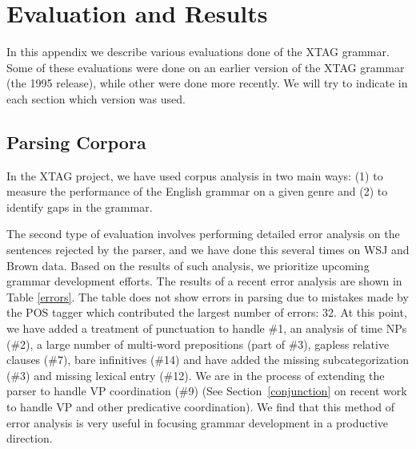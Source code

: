 \chapter{Evaluation and Results}
\label{evaluation}

In this appendix we describe various evaluations done of the XTAG
grammar. Some of these evaluations were done on an earlier version of
the XTAG grammar (the 1995 release), while other were done more
recently. We will try to indicate in each section which version was
used. 

\section{Parsing Corpora}

In the XTAG project, we have used corpus analysis in two main ways:
(1) to measure the performance of the English grammar on a given genre
and (2) to identify gaps in the grammar. 

The second type of evaluation involves performing detailed error
analysis on the sentences rejected by the parser, and we have done
this several times on WSJ and Brown data.
Based on the results of such analysis, we prioritize upcoming grammar
development efforts. The results of a recent error analysis are shown
in Table \ref{errors}.  The table does not show errors in parsing due
to mistakes made by the POS tagger which contributed the largest
number of errors: 32. At this point, we have added a treatment of
punctuation to handle \#1, an analysis of time NPs (\#2), a large
number of multi-word prepositions (part of \#3), gapless relative
clauses (\#7), bare infinitives (\#14) and have added the missing
subcategorization (\#3) and missing lexical entry (\#12).  We are in
the process of extending the parser to handle VP coordination (\#9)
(See Section~\ref{conjunction} on recent work to handle VP and other
predicative coordination). We find that this method of error analysis
is very useful in focusing grammar development in a productive
direction.

